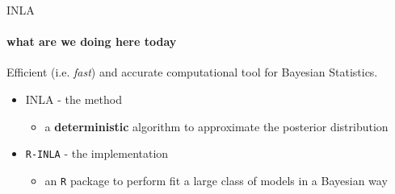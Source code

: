 \documentclass[9pt,ignorenonframetext,]{beamer}
\providecommand{\tightlist}{%
  \setlength{\itemsep}{0pt}\setlength{\parskip}{0pt}}
\begin{document}
\begin{frame}[fragile]{INLA}
\protect\hypertarget{inla}{}

\framesubtitle{what are we doing here today}

Efficient (i.e. \emph{fast}) and accurate computational tool for
Bayesian Statistics.

\vspace{.7cm}

\begin{itemize}
\tightlist
\item
  INLA - the method

  \begin{itemize}
  \tightlist
  \item
    a \textbf{deterministic} algorithm to approximate the posterior
    distribution
  \end{itemize}
\end{itemize}

\vspace{0.5cm}

\begin{itemize}
\tightlist
\item
  \texttt{R-INLA} - the implementation

  \begin{itemize}
  \tightlist
  \item
    an \texttt{R} package to perform fit a large class of models in a
    Bayesian way
  \end{itemize}
\end{itemize}

\end{frame}
\end{document}
